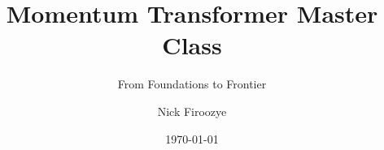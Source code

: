 \documentclass[10pt]{beamer}
\title{Momentum Transformer Master Class}
\subtitle{From Foundations to Frontier}
\author{Nick Firoozye}
\date{\today}
\begin{document}
\maketitle
\nocite{*}



\end{document}
